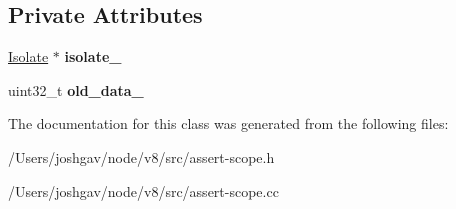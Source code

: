 \subsection*{Private Attributes}
\begin{DoxyCompactItemize}
\item 
\hyperlink{classv8_1_1internal_1_1_isolate}{Isolate} $\ast$ {\bfseries isolate\+\_\+}\hypertarget{classv8_1_1internal_1_1_per_isolate_assert_scope_aa42ce6edc818bcaad1907e976302a80d}{}\label{classv8_1_1internal_1_1_per_isolate_assert_scope_aa42ce6edc818bcaad1907e976302a80d}

\item 
uint32\+\_\+t {\bfseries old\+\_\+data\+\_\+}\hypertarget{classv8_1_1internal_1_1_per_isolate_assert_scope_af2899c753bcf556d14170a56ac47e24d}{}\label{classv8_1_1internal_1_1_per_isolate_assert_scope_af2899c753bcf556d14170a56ac47e24d}

\end{DoxyCompactItemize}


The documentation for this class was generated from the following files\+:\begin{DoxyCompactItemize}
\item 
/\+Users/joshgav/node/v8/src/assert-\/scope.\+h\item 
/\+Users/joshgav/node/v8/src/assert-\/scope.\+cc\end{DoxyCompactItemize}
